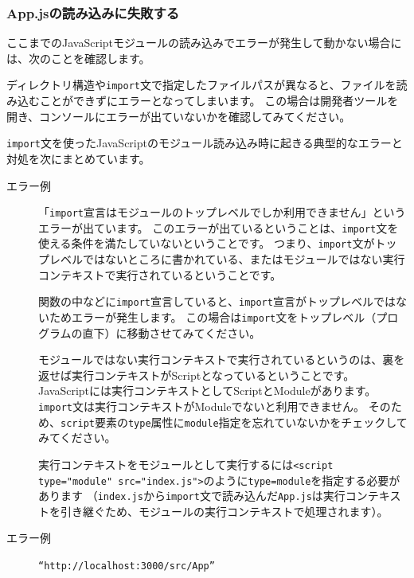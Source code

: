 \hypertarget{error-import-app-js}{%
\subsubsection{App.jsの読み込みに失敗する}\label{error-import-app-js}}

ここまでのJavaScriptモジュールの読み込みでエラーが発生して動かない場合には、次のことを確認します。

ディレクトリ構造や\texttt{import}文で指定したファイルパスが異なると、ファイルを読み込むことができずにエラーとなってしまいます。
この場合は開発者ツールを開き、コンソールにエラーが出ていないかを確認してみてください。

\texttt{import}文を使ったJavaScriptのモジュール読み込み時に起きる典型的なエラーと対処を次にまとめています。
\newpage
\begin{description}
\item[エラー例] 

「\texttt{import}宣言はモジュールのトップレベルでしか利用できません」というエラーが出ています。
このエラーが出ているということは、\texttt{import}文を使える条件を満たしていないということです。
つまり、\texttt{import}文がトップレベルではないところに書かれている、またはモジュールではない実行コンテキストで実行されているということです。

関数の中などに\texttt{import}宣言していると、\texttt{import}宣言がトップレベルではないためエラーが発生します。
この場合は\texttt{import}文をトップレベル（プログラムの直下）に移動させてみてください。

モジュールではない実行コンテキストで実行されているというのは、裏を返せば実行コンテキストがScriptとなっているということです。
JavaScriptには実行コンテキストとしてScriptとModuleがあります。
\texttt{import}文は実行コンテキストがModuleでないと利用できません。
そのため、\texttt{script}要素の\texttt{type}属性に\texttt{module}指定を忘れていないかをチェックしてみてください。

実行コンテキストをモジュールとして実行するには\texttt{<script type="module" src="index.js">}のように\texttt{type=module}を指定する必要があります
（\texttt{index.js}から\texttt{import}文で読み込んだ\texttt{App.js}は実行コンテキストを引き継ぐため、モジュールの実行コンテキストで処理されます）。

\item[エラー例] \texttt{``http://localhost:3000/src/App''}


\end{description}
